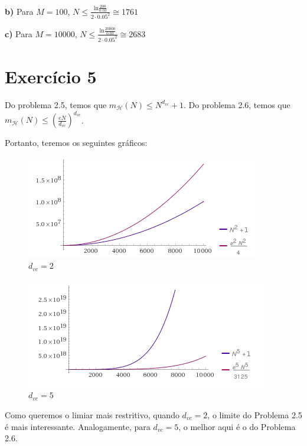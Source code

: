 \documentclass[12pt,letterpaper]{article}
\begin{document}
	\textbf{b)} Para $M = 100$, $N \leq \frac{\text{ln} \frac{200}{0.03}}{2 \cdot 0.05^2} \cong 1761$
	
	\textbf{c)} Para $M = 10000$, $N \leq \frac{\text{ln} \frac{20000}{0.03}}{2 \cdot 0.05^2} \cong 2683$
	
	\section*{Exercício 5}
	
	Do problema 2.5, temos que $ m_{\mathcal{H}}(N) \leq N^{d_{vc}} +1 $. Do problema 2.6, temos que $ m_{\mathcal{H}}(N) \leq \left(\frac{eN}{d_{vc}}\right)^{d_{vc}}$. 
	
	Portanto, teremos os seguintes gráficos:
	
	\begin{figure}[h]
		\includegraphics[width=\linewidth/2]{exercicio5a}
		\centering
		\caption{$d_{vc} = 2$}
	\end{figure}
	
	\begin{figure}[h]
		\includegraphics[width=\linewidth/2]{exercicio5b}
		\centering
		\caption{$d_{vc} = 5$}
	\end{figure}
	
	Como queremos o limiar mais restritivo, quando $d_{vc} = 2$, o limite do Problema 2.5 é mais interessante. Analogamente, para $d_{vc} = 5$, o melhor aqui é o do Problema 2.6.
	
\end{document}
